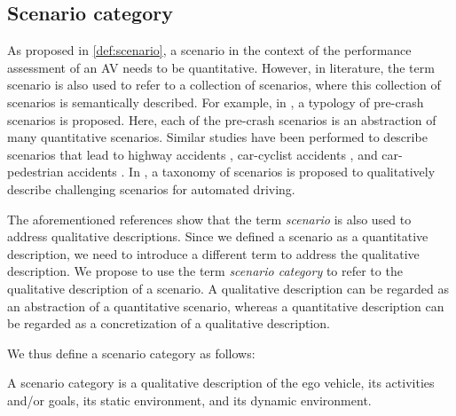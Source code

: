 \cbstartd
\subsection{Scenario category}
\label{sec:scenario category}
\cbend

\cbstart
As proposed in \cref{def:scenario}, a scenario in the context of the performance assessment of an AV needs to be quantitative. 
However, in literature, the term scenario is also used to refer to a collection of scenarios, where this collection of scenarios is semantically described. For example, in \cite{USDoT2007precrashscenarios}, a typology of pre-crash scenarios is proposed. Here, each of the pre-crash scenarios is an abstraction of many quantitative scenarios. Similar studies have been performed to describe scenarios that lead to highway accidents \cite{adaptive2017d73}, car-cyclist accidents \cite{opdencamp2014cats}, and car-pedestrian accidents \cite{lenard2014typical}. In \cite{catapult2017taxonomy}, a taxonomy of scenarios is proposed to qualitatively describe challenging scenarios for automated driving.

The aforementioned references \cite{USDoT2007precrashscenarios, adaptive2017d73, opdencamp2014cats, lenard2014typical, catapult2017taxonomy} show that the term \emph{scenario} is also used to address qualitative descriptions. Since we defined a scenario as a quantitative description, we need to introduce a different term to address the qualitative description. We propose to use the term \emph{scenario category} to refer to the qualitative description of a scenario. A qualitative description can be regarded as an abstraction of a quantitative scenario, \cbstartb whereas a quantitative description can be regarded as a concretization of a qualitative description.
\cbend

We thus define a scenario category as follows:
\begin{definition} \label{def:scenario category}
	A scenario category is a qualitative description of the ego vehicle, its activities and/or goals, its static environment, and its dynamic environment.
\end{definition}

